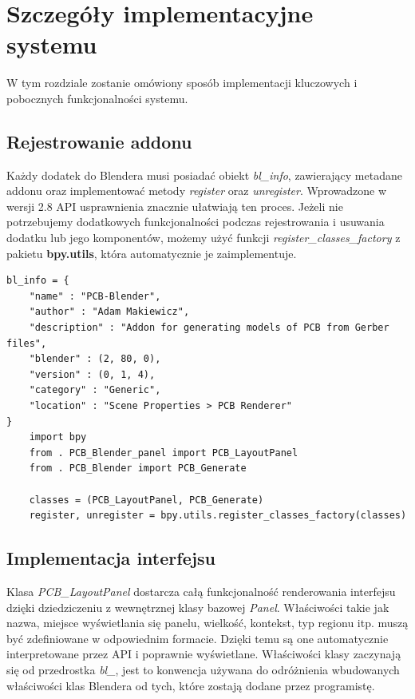 \documentclass[brudnopis]{xmgr}
\begin{document}
\chapter{Szczegóły implementacyjne systemu}
W tym rozdziale zostanie omówiony sposób implementacji kluczowych i pobocznych funkcjonalności systemu.

\section {Rejestrowanie addonu}
Każdy dodatek do Blendera musi posiadać obiekt \emph{bl\_info}, zawierający metadane addonu oraz implementować metody \emph{register} oraz \emph{unregister}. Wprowadzone w wersji 2.8 API usprawnienia znacznie ułatwiają ten proces. Jeżeli nie potrzebujemy dodatkowych funkcjonalności podczas rejestrowania i usuwania dodatku lub jego komponentów, możemy użyć funkcji \emph{register\_classes\_factory} z pakietu \textbf{bpy.utils}, która automatycznie je zaimplementuje.

\begin{lstlisting}
bl_info = {
	"name" : "PCB-Blender",
	"author" : "Adam Makiewicz",
	"description" : "Addon for generating models of PCB from Gerber files",
	"blender" : (2, 80, 0),
	"version" : (0, 1, 4),
	"category" : "Generic",
	"location" : "Scene Properties > PCB Renderer"
}
	import bpy
	from . PCB_Blender_panel import PCB_LayoutPanel
	from . PCB_Blender import PCB_Generate

	classes = (PCB_LayoutPanel, PCB_Generate)
	register, unregister = bpy.utils.register_classes_factory(classes)
\end{lstlisting}

\section {Implementacja interfejsu}

Klasa \emph{PCB\_LayoutPanel} dostarcza całą funkcjonalność renderowania interfejsu dzięki dziedziczeniu z wewnętrznej klasy bazowej \emph{Panel}. Właściwości takie jak nazwa, miejsce wyświetlania się panelu, wielkość, kontekst, typ regionu itp. muszą być zdefiniowane w odpowiednim formacie. Dzięki temu są one automatycznie interpretowane przez API i poprawnie wyświetlane. Właściwości klasy zaczynają się od przedrostka \emph{bl\_}, jest to konwencja używana do odróżnienia wbudowanych właściwości klas Blendera od tych, które zostają dodane przez programistę.
\end{document}
